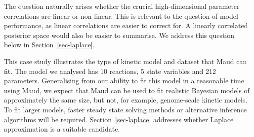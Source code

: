\documentclass[journal=asbcd6,manuscript=article,layout=traditional]{achemso}
\begin{document}
The question naturally arises whether the crucial high-dimensional
parameter correlations are linear or non-linear. This is relevant to the
question of model performance, as linear correlations are easier to
correct for. A linearly correlated posterior space would also be easier
to summarise. We address this question below in
Section~\ref{sec-laplace}.

This case study illustrates the type of kinetic model and dataset that
Maud can fit. The model we analysed has 10 reactions, 5 state variables
and 212 parameters. Generalising from our ability to fit this model in a
reasonable time using Maud, we expect that Maud can be used to fit
realistic Bayesian models of approximately the same size, but not, for
example, genome-scale kinetic models. To fit larger models, faster
steady state solving methods or alternative inference algorithms will be
required. Section~\ref{sec-laplace} addresses whether Laplace
approximation is a suitable candidate.
\end{document}
